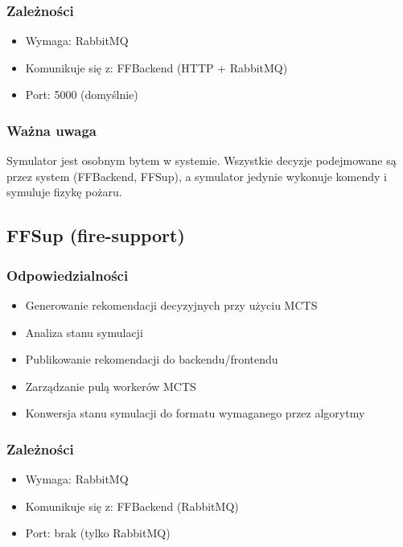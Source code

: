\subsubsection{Zależności}

\begin{itemize}
    \item Wymaga: RabbitMQ
    \item Komunikuje się z: FFBackend (HTTP + RabbitMQ)
    \item Port: 5000 (domyślnie)
\end{itemize}

\subsubsection{Ważna uwaga}

Symulator jest osobnym bytem w systemie. Wszystkie decyzje podejmowane są przez system (FFBackend, FFSup), a symulator jedynie wykonuje komendy i symuluje fizykę pożaru.

\subsection{FFSup (fire-support)}

\subsubsection{Odpowiedzialności}

\begin{itemize}
    \item Generowanie rekomendacji decyzyjnych przy użyciu MCTS
    \item Analiza stanu symulacji
    \item Publikowanie rekomendacji do backendu/frontendu
    \item Zarządzanie pulą workerów MCTS
    \item Konwersja stanu symulacji do formatu wymaganego przez algorytmy
\end{itemize}

\subsubsection{Zależności}

\begin{itemize}
    \item Wymaga: RabbitMQ
    \item Komunikuje się z: FFBackend (RabbitMQ)
    \item Port: brak (tylko RabbitMQ)
\end{itemize}

